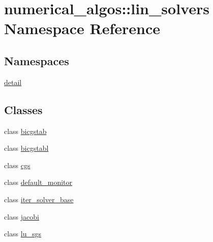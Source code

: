 \hypertarget{namespacenumerical__algos_1_1lin__solvers}{\section{numerical\-\_\-algos\-:\-:lin\-\_\-solvers Namespace Reference}
\label{namespacenumerical__algos_1_1lin__solvers}
}
\subsection*{Namespaces}
\begin{DoxyCompactItemize}
\item 
\hyperlink{namespacenumerical__algos_1_1lin__solvers_1_1detail}{detail}
\end{DoxyCompactItemize}
\subsection*{Classes}
\begin{DoxyCompactItemize}
\item 
class \hyperlink{classnumerical__algos_1_1lin__solvers_1_1bicgstab}{bicgstab}
\item 
class \hyperlink{classnumerical__algos_1_1lin__solvers_1_1bicgstabl}{bicgstabl}
\item 
class \hyperlink{classnumerical__algos_1_1lin__solvers_1_1cgs}{cgs}
\item 
class \hyperlink{classnumerical__algos_1_1lin__solvers_1_1default__monitor}{default\-\_\-monitor}
\item 
class \hyperlink{classnumerical__algos_1_1lin__solvers_1_1iter__solver__base}{iter\-\_\-solver\-\_\-base}
\item 
class \hyperlink{classnumerical__algos_1_1lin__solvers_1_1jacobi}{jacobi}
\item 
class \hyperlink{classnumerical__algos_1_1lin__solvers_1_1lu__sgs}{lu\-\_\-sgs}
\end{DoxyCompactItemize}
